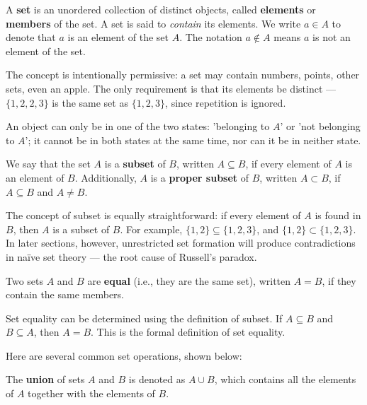 \begin{definition}[Set]
A \textbf{set} is an unordered collection of distinct objects, called \textbf{elements} or \textbf{members} of the set. A set is said to \emph{contain} its elements. We write $a \in A$ to denote that $a$ is an element of the set $A$. The notation $a \notin A$ means $a$ is not an element of the set.
\end{definition}

The concept is intentionally permissive: a set may contain numbers, points, other sets, even an apple. The only requirement is that its elements be distinct — $\{1, 2, 2, 3\}$ is the same set as $\{1, 2, 3\}$, since repetition is ignored.

\begin{note}
An object can only be in one of the two states: 'belonging to $A$' or 'not belonging to $A$'; it cannot be in both states at the same time, nor can it be in neither state.
\end{note}


\begin{definition}[Subset]
We say that the set $A$ is a \textbf{subset} of $B$, written $A \subseteq B$, if every element of $A$ is an element of $B$. Additionally, $A$ is a \textbf{proper subset} of $B$, written $A \subset B$, if $A \subseteq B$ and $A \ne B$.
\end{definition}

The concept of subset is equally straightforward: if every element of $A$ is found in $B$, then $A$ is a subset of $B$. For example, $\{1, 2\} \subseteq \{1, 2, 3\}$, and $\{1, 2\} \subset \{1, 2, 3\}$. In later sections, however, unrestricted set formation will produce contradictions in naïve set theory — the root cause of Russell's paradox.

\begin{definition}[Equality]
Two sets $A$ and $B$ are \textbf{equal} (i.e., they are the same set), written $A = B$, if they contain the same members.
\end{definition}

Set equality can be determined using the definition of subset. If $A \subseteq B$ and $B \subseteq A$, then $A = B$. This is the formal definition of set equality.

Here are several common set operations, shown below:

\begin{definition}
The \textbf{union} of sets $A$ and $B$ is denoted as $A \cup B$, which contains all the elements of $A$ together with the elements of $B$.
\end{definition}

